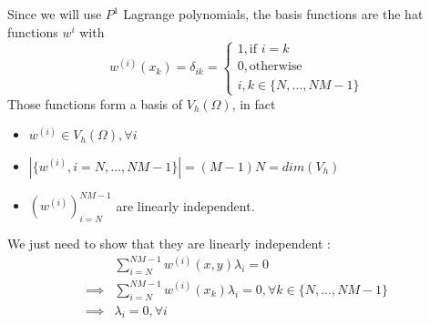 \documentclass[a4paper]{report}
\begin{document}
Since we will use $P^1$ Lagrange polynomials, 
the basis functions are the hat functions $w^{i}$ with
\[
w^{(i)}(x_{k})= \delta_{ik} =  \left\{
\begin{matrix}
1,\text{if $i=k$} \\
0,\text{otherwise}\\
i,k \in \{N,...,NM-1\}
\end{matrix}
\right.
\]
Those functions form a basis of $V_h(\Omega)$, in fact
\begin{itemize}
\item $w^{(i)} \in V_h(\Omega),\forall i$
\item $|\{ w^{(i)},i=N,...,NM-1 \} |=(M-1)N=dim(V_h)$
\item $(w^{(i)})_{i=N}^{NM-1}$ are linearly independent.
\end{itemize}
We just need to show that they are linearly independent :
\begin{align*}
&\sum_{i=N}^{NM-1} w^{(i)}(x,y)\lambda_{i}=0\\
\implies & \sum_{i=N}^{NM-1} w^{(i)}(x_k)\lambda_{i}=0,\forall k \in \{N,...,NM-1 \}\\
\implies & \lambda_{i}=0,\forall i
\end{align*}
\end{document}
